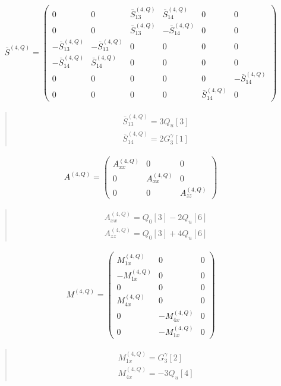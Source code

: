 \documentclass[fleqn,10pt]{jsarticle}
\begin{document}
\begin{align*}
\bar{S}^{(4,Q)} = \begin{pmatrix} 0 & 0 & \bar{S}^{(4,Q)}_{13} & \bar{S}^{(4,Q)}_{14} & 0 & 0 \\ 0 & 0 & \bar{S}^{(4,Q)}_{13} & - \bar{S}^{(4,Q)}_{14} & 0 & 0 \\ - \bar{S}^{(4,Q)}_{13} & - \bar{S}^{(4,Q)}_{13} & 0 & 0 & 0 & 0 \\ - \bar{S}^{(4,Q)}_{14} & \bar{S}^{(4,Q)}_{14} & 0 & 0 & 0 & 0 \\ 0 & 0 & 0 & 0 & 0 & - \bar{S}^{(4,Q)}_{14} \\ 0 & 0 & 0 & 0 & \bar{S}^{(4,Q)}_{14} & 0 \end{pmatrix}
\end{align*}
\begin{quote}
\begin{align*}
& \bar{S}^{(4,Q)}_{13} = 3 Q_{u}[3] \\
& \bar{S}^{(4,Q)}_{14} = 2 G_{3}^{\gamma}[1]
\end{align*}
\end{quote}
\begin{align*}
A^{(4,Q)} = \begin{pmatrix} A^{(4,Q)}_{xx} & 0 & 0 \\ 0 & A^{(4,Q)}_{xx} & 0 \\ 0 & 0 & A^{(4,Q)}_{zz} \end{pmatrix}
\end{align*}
\begin{quote}
\begin{align*}
& A^{(4,Q)}_{xx} = Q_{0}[3] - 2 Q_{u}[6] \\
& A^{(4,Q)}_{zz} = Q_{0}[3] + 4 Q_{u}[6]
\end{align*}
\end{quote}
\begin{align*}
M^{(4,Q)} = \begin{pmatrix} M^{(4,Q)}_{1x} & 0 & 0 \\ - M^{(4,Q)}_{1x} & 0 & 0 \\ 0 & 0 & 0 \\ M^{(4,Q)}_{4x} & 0 & 0 \\ 0 & - M^{(4,Q)}_{4x} & 0 \\ 0 & - M^{(4,Q)}_{1x} & 0 \end{pmatrix}
\end{align*}
\begin{quote}
\begin{align*}
& M^{(4,Q)}_{1x} = G_{3}^{\gamma}[2] \\
& M^{(4,Q)}_{4x} = - 3 Q_{u}[4]
\end{align*}
\end{quote}
\end{document}
